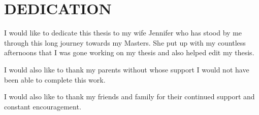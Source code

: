 \chapter*{DEDICATION}

I would like to dedicate this thesis to my wife Jennifer who has stood by me through this long journey towards my Masters.  She put up with my countless afternoons that I was gone working on my thesis and also helped edit my thesis.  

I would also like to thank my parents without whose support I would not have been able to complete this work.

I would also like to thank my friends and family for their continued support and constant encouragement.